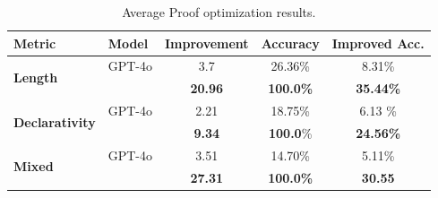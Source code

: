 




\begin{table}[t]
\caption{Average Proof optimization results.}
\label{tab:main-avg}
\centering
\small
\begin{tabular}{ll|ccc}
\toprule
Metric& Model &Improvement &Accuracy& Improved Acc.\\
\midrule
\multirow{2}{*}{\textbf{Length}} & GPT-4o & 3.7 & 26.36\% & 8.31\% \\
&\textbf{\methodname{}} &\textbf{20.96} & \textbf{100.0\%} & \textbf{35.44\%} \\
\midrule
\multirow{2}{*}{\textbf{Declarativity}} & GPT-4o &2.21 & 18.75\% & 6.13 \%\\
&\textbf{\methodname{}} & \textbf{9.34} & \textbf{100.0}\%& \textbf{24.56\%}\\
\midrule
\multirow{2}{*}{\textbf{Mixed}} & GPT-4o &3.51 & 14.70\% & 5.11\% \\
&\methodname{} & \textbf{27.31} & \textbf{100.0\%} & \textbf{30.55}\\
\bottomrule
\end{tabular}
\vspace{-1em}
\end{table}


